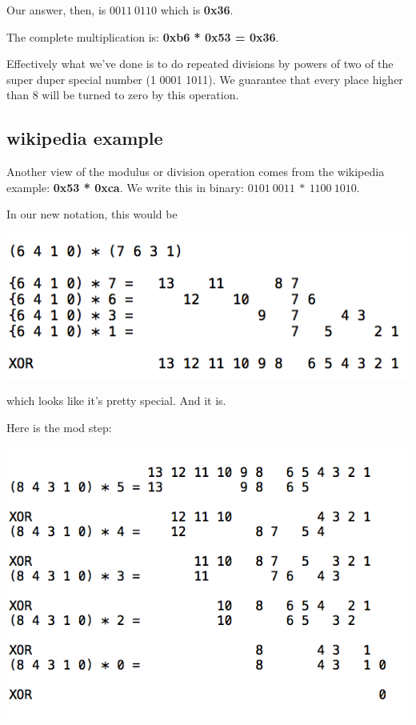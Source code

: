 \documentclass[11pt, oneside]{article}
\begin{document}
Our answer, then, is $0011 \ 0110$ which is \textbf{0x36}.

The complete multiplication is:  \textbf{0xb6 * 0x53 = 0x36}.

Effectively what we've done is to do repeated divisions by powers of two of the super duper special number (1 0001 1011).  We guarantee that every place higher than $8$ will be turned to zero by this operation.

\subsection*{wikipedia example}

Another view of the modulus or division operation comes from the wikipedia example:  \textbf{0x53 * 0xca}.  We write this in binary:  $0101 \ 0011 \ * \ 1100 \ 1010$.

In our new notation, this would be

\begin{center} \includegraphics [scale=0.6] {figs/GFmath3.png} \end{center}
which looks like it's pretty special.  And it is. 

 Here is the mod step:
\begin{center} \includegraphics [scale=0.6] {figs/GFmath4.png} \end{center}
\end{document}
